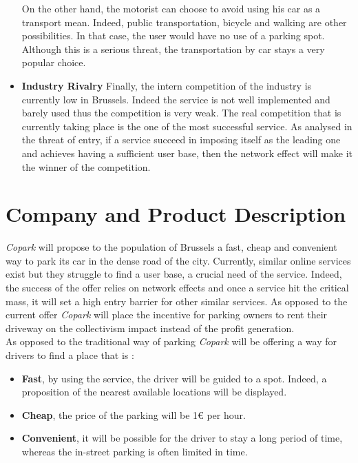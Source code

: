 \documentclass[12pt,a4paper,oneside]{book}
\newcommand{\bp}{\textit{Copark }}
\begin{document}
\begin{itemize}
On the other hand, the motorist can choose to avoid using his car as a transport mean. Indeed, public transportation, bicycle and walking are other possibilities. In that case, the user would have no use of a parking spot. Although this is a serious threat, the transportation by car stays a very popular choice.
\item \textbf{Industry Rivalry} Finally, the intern competition of the industry is currently low in Brussels. Indeed the service is not well implemented and barely used thus the competition is very weak. The real competition that is currently taking place is the one of the most successful service. As analysed in the threat of entry, if a service succeed in imposing itself as the leading one and achieves  having a sufficient user base, then the network effect will make it the winner of the competition.
\end{itemize}

\chapter{Company and Product Description}

\bp will propose to the population of Brussels a fast, cheap and convenient way to park its car in the dense road of the city. Currently, similar online services exist but they struggle to find a user base, a crucial need of the service. Indeed, the success of the offer relies on network effects and once a service hit the critical mass, it will set a high entry barrier for other similar services. As opposed to the current offer \bp will place the incentive for parking owners to rent their driveway on the collectivism impact instead of the profit generation.\\

As opposed to the traditional way of parking \bp will be offering a way for drivers to find a place that is :
\begin{itemize}
\item \textbf{Fast}, by using the service, the driver will be guided to a spot. Indeed, a proposition of the nearest available locations will be displayed.
\item \textbf{Cheap}, the price of the parking will be 1\euro{} per hour.
\item \textbf{Convenient}, it will be possible for the driver to stay a long period of time, whereas the in-street parking is often limited in time.
\end{itemize} 
\end{document}
